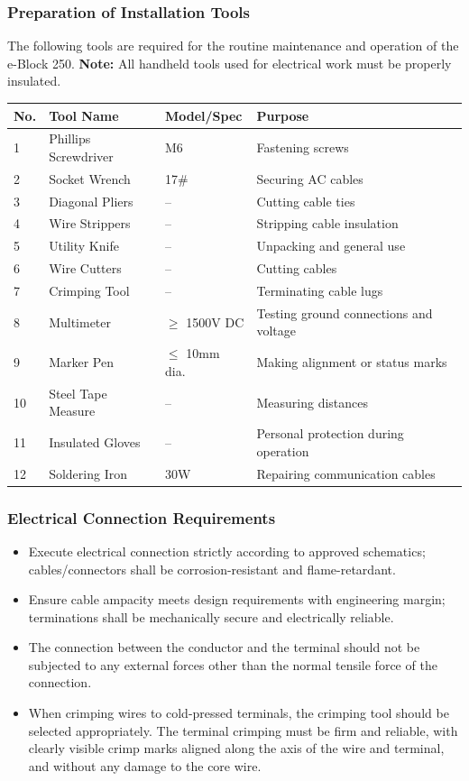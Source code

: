 \documentclass[11pt, a4paper]{article}
\begin{document}
\subsubsection{Preparation of Installation Tools}
The following tools are required for the routine maintenance and operation of the e-Block 250. \textbf{Note:} All handheld tools used for electrical work must be properly insulated.

\begin{tabularx}{\textwidth}{l l l X}
\toprule
\textbf{No.} & \textbf{Tool Name} & \textbf{Model/Spec} & \textbf{Purpose} \\
\midrule
1 & Phillips Screwdriver & M6 & Fastening screws \\
2 & Socket Wrench & 17\# & Securing AC cables \\
3 & Diagonal Pliers & -- & Cutting cable ties \\
4 & Wire Strippers & -- & Stripping cable insulation \\
5 & Utility Knife & -- & Unpacking and general use \\
6 & Wire Cutters & -- & Cutting cables \\
7 & Crimping Tool & -- & Terminating cable lugs \\
8 & Multimeter & $\ge$ 1500V DC & Testing ground connections and voltage \\
9 & Marker Pen & $\le$ 10mm dia. & Making alignment or status marks \\
10 & Steel Tape Measure & -- & Measuring distances \\
11 & Insulated Gloves & -- & Personal protection during operation \\
12 & Soldering Iron & 30W & Repairing communication cables \\
\bottomrule
\end{tabularx}

\subsubsection{Electrical Connection Requirements}
\begin{itemize}[leftmargin=1.5em]
    \item Execute electrical connection strictly according to approved schematics; cables/connectors shall be corrosion-resistant and flame-retardant.
    \item Ensure cable ampacity meets design requirements with engineering margin; terminations shall be mechanically secure and electrically reliable.
    \item The connection between the conductor and the terminal should not be subjected to any external forces other than the normal tensile force of the connection.
    \item When crimping wires to cold-pressed terminals, the crimping tool should be selected appropriately. The terminal crimping must be firm and reliable, with clearly visible crimp marks aligned along the axis of the wire and terminal, and without any damage to the core wire.
\end{itemize}
\end{document}
